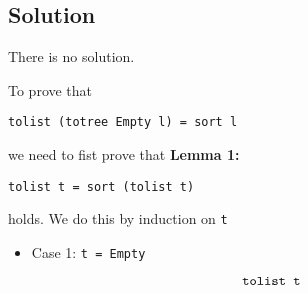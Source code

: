 \subsection*{Solution}

There is no solution.

To prove that
\begin{center}
    \texttt{tolist (totree Empty l) = sort l}
\end{center}
we need to fist prove that
\textbf{Lemma 1:}
\begin{center}
    \texttt{tolist t = sort (tolist t)}
\end{center}
holds. We do this by induction on \texttt{t}
\begin{itemize}
    \item {
        Case 1: \texttt{t = Empty}

        \begin{displaymath}
            \texttt{tolist t} \\
        \end{displaymath}
    }
\end{itemize}